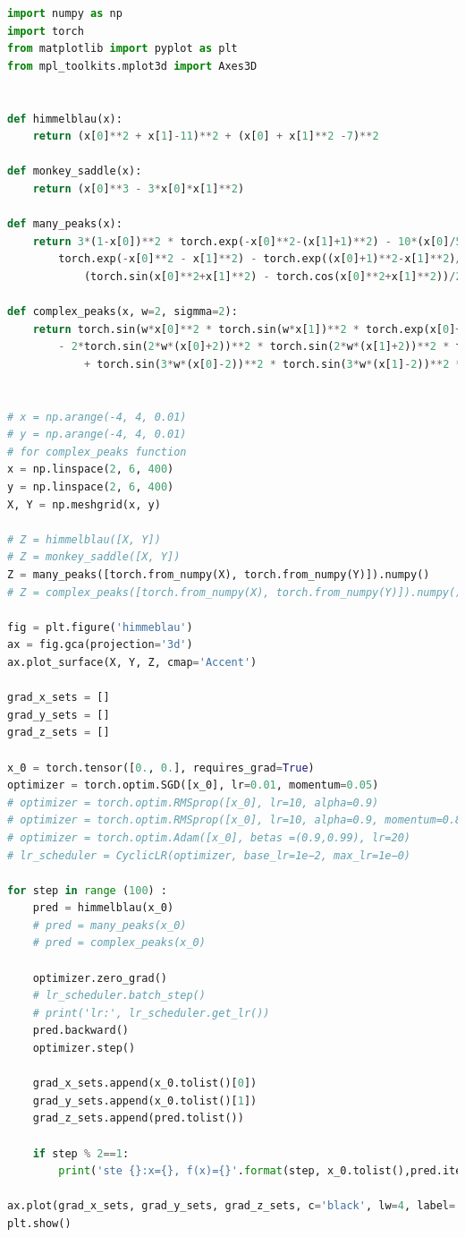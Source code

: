 \documentclass[UTF8]{ctexart}
\begin{document}
\lstset{style=mystyle}
\begin{lstlisting}[language=Python]
import numpy as np
import torch
from matplotlib import pyplot as plt
from mpl_toolkits.mplot3d import Axes3D


def himmelblau(x):
	return (x[0]**2 + x[1]-11)**2 + (x[0] + x[1]**2 -7)**2

def monkey_saddle(x):
	return (x[0]**3 - 3*x[0]*x[1]**2)

def many_peaks(x):
	return 3*(1-x[0])**2 * torch.exp(-x[0]**2-(x[1]+1)**2) - 10*(x[0]/5 - x[0]**3 - x[1]**5) * \
		torch.exp(-x[0]**2 - x[1]**2) - torch.exp((x[0]+1)**2-x[1]**2)/3 - \
			(torch.sin(x[0]**2+x[1]**2) - torch.cos(x[0]**2+x[1]**2))/2

def complex_peaks(x, w=2, sigmma=2):
	return torch.sin(w*x[0]**2 * torch.sin(w*x[1])**2 * torch.exp(x[0]+x[1])/sigmma**2) \
		- 2*torch.sin(2*w*(x[0]+2))**2 * torch.sin(2*w*(x[1]+2))**2 * torch.exp((x[0]+x[1])/sigmma**2) \
			+ torch.sin(3*w*(x[0]-2))**2 * torch.sin(3*w*(x[1]-2))**2 * torch.exp((x[0]+x[1])/sigmma**2)
			

# x = np.arange(-4, 4, 0.01)
# y = np.arange(-4, 4, 0.01)
# for complex_peaks function
x = np.linspace(2, 6, 400)
y = np.linspace(2, 6, 400)
X, Y = np.meshgrid(x, y)

# Z = himmelblau([X, Y])
# Z = monkey_saddle([X, Y])
Z = many_peaks([torch.from_numpy(X), torch.from_numpy(Y)]).numpy()
# Z = complex_peaks([torch.from_numpy(X), torch.from_numpy(Y)]).numpy()

fig = plt.figure('himmeblau')
ax = fig.gca(projection='3d')
ax.plot_surface(X, Y, Z, cmap='Accent')

grad_x_sets = []
grad_y_sets = []
grad_z_sets = []

x_0 = torch.tensor([0., 0.], requires_grad=True)
optimizer = torch.optim.SGD([x_0], lr=0.01, momentum=0.05)
# optimizer = torch.optim.RMSprop([x_0], lr=10, alpha=0.9)
# optimizer = torch.optim.RMSprop([x_0], lr=10, alpha=0.9, momentum=0.85)
# optimizer = torch.optim.Adam([x_0], betas =(0.9,0.99), lr=20)
# lr_scheduler = CyclicLR(optimizer, base_lr=1e−2, max_lr=1e−0)

for step in range (100) :
	pred = himmelblau(x_0)
	# pred = many_peaks(x_0)
	# pred = complex_peaks(x_0)
	
	optimizer.zero_grad()
	# lr_scheduler.batch_step()
	# print('lr:', lr_scheduler.get_lr())
	pred.backward()
	optimizer.step()

	grad_x_sets.append(x_0.tolist()[0])
	grad_y_sets.append(x_0.tolist()[1])
	grad_z_sets.append(pred.tolist())

	if step % 2==1:
		print('ste {}:x={}, f(x)={}'.format(step, x_0.tolist(),pred.item()))

ax.plot(grad_x_sets, grad_y_sets, grad_z_sets, c='black', lw=4, label='gradient decent curve')
plt.show()
		
\end{lstlisting}
\end{document}
